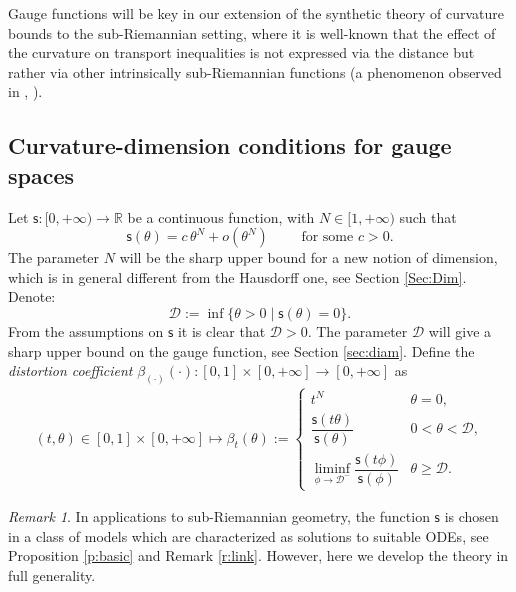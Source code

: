 \documentclass[11pt,a4paper]{article}
\theoremstyle{plain}
\theoremstyle{definition}
\theoremstyle{remark}
\newtheorem{remark}[theorem]{Remark}
\numberwithin{equation}{section}
\newcommand{\R}{\mathbb{R}} %
\newcommand{\cD}{\mathcal{D}}
\newcommand{\sfs}{\mathsf{s}}
\begin{document}
Gauge functions will be key in our extension of the synthetic theory of curvature bounds to the sub-Riemannian setting, where it is well-known that the effect of the curvature on transport inequalities is not expressed via the distance but rather via other intrinsically sub-Riemannian functions (a phenomenon observed in \cite{BKS}, \cite[Sec.\@ 8.1]{BRInv}).

\subsection{Curvature-dimension conditions for gauge spaces}


Let $\sfs:[0,+\infty)\to \R$ be a continuous function, with $N\in [1,+\infty)$ such that
\begin{equation}\label{eq:fftcN}
\sfs(\theta)=c \, \theta^{N}+o(\theta^{N}) \qquad \text{ for some } c >0.
\end{equation}
The parameter $N$ will be the sharp upper bound for a new notion of dimension, which is in general different from the Hausdorff one, see Section \ref{Sec:Dim}. 
Denote:
\begin{equation}\label{eq:defcD}
\cD:=\inf\{\theta>0\mid \sfs(\theta)=0\}.
\end{equation}  
From the assumptions on $\sfs$ it is clear that $\cD>0$.
The parameter $\cD$ will give a sharp upper bound on the gauge function, see Section \ref{sec:diam}.
 Define the \emph{distortion coefficient} $\beta_{(\cdot)}(\cdot):[0,1]\times [0,+\infty]\to [0,+\infty]$ as
\begin{align}\label{eq:defbeta}
 (t,\theta)\in [0,1]\times [0,+\infty]\mapsto \beta_{t}(\theta):=
 \begin{cases}
 t^{N} &\theta =0, \\
\dfrac{\sfs(t\theta )}{\sfs(\theta)}& 0<\theta <\cD,\\
 \displaystyle  \liminf_{\phi \to \cD^-} \dfrac{\sfs(t\phi )}{\sfs(\phi)} & \theta \geq \cD.\end{cases}
\end{align}

\begin{remark}\label{rem:sODE}
In applications to sub-Riemannian geometry,  the function  $\sfs$ is chosen in a class of models which are  characterized as solutions to suitable ODEs, see Proposition \ref{p:basic} and Remark \ref{r:link}. However, here we develop the theory in full generality. 
\end{remark}
\end{document}
